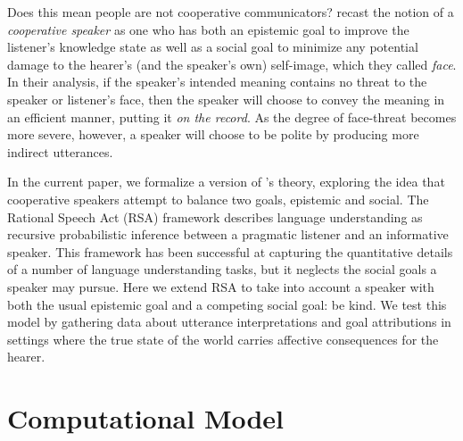 \documentclass[10pt,letterpaper]{article}
\begin{document}
Does this mean people are not cooperative communicators? 
 recast the notion of a \emph{cooperative speaker} as one
who has both an epistemic goal to improve the listener's knowledge state as well as a social goal to minimize any potential damage to the hearer's (and the speaker's own) self-image, which they called \emph{face}.
In their analysis, if the speaker's intended meaning contains no threat to the speaker or listener's face,
then the speaker will choose to convey the meaning in an efficient manner, putting it \emph{on the record}.
As the degree of face-threat becomes more severe, however,
a speaker will choose to be polite by producing more indirect utterances.

In the current paper, we formalize a version of 's theory, exploring the idea that cooperative speakers attempt to balance two goals, epistemic and social.
The Rational Speech Act (RSA) framework \cite{Frank2012, Goodman2013} describes language understanding as recursive probabilistic inference between a pragmatic listener and an informative speaker. This framework has been successful at capturing the quantitative details of a number of language understanding tasks, but it neglects the social goals a speaker may pursue.
Here we extend RSA to take into account a speaker with both the usual epistemic goal and a competing social goal: be kind.
We test this model by gathering data about utterance interpretations and goal attributions in settings where the true state of the world carries affective consequences for the hearer.


\section{Computational Model}
\end{document}
